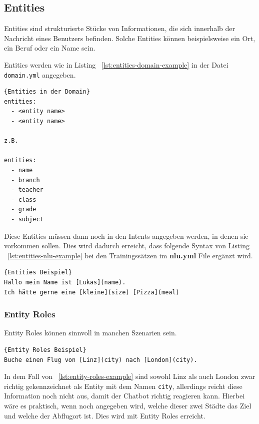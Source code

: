 \subsection{Entities}\label{subsection:entities}

Entities sind strukturierte Stücke von Informationen, die sich innerhalb der Nachricht eines Benutzers befinden.
Solche Entities können beispielsweise ein Ort, ein Beruf oder ein Name sein.\cite{entities}

Entities werden wie in Listing ~\ref{lst:entities-domain-example} in der Datei \texttt{domain.yml} angegeben.

\begin{lstlisting}[label={lst:entities-domain-example},caption={Entities in der Domain}]{Entities in der Domain}
entities:
  - <entity name>
  - <entity name>

z.B.

entities:
  - name
  - branch
  - teacher
  - class
  - grade
  - subject
\end{lstlisting}

Diese Entities müssen dann noch in den Intents angegeben werden, in denen sie vorkommen sollen.
Dies wird dadurch erreicht, dass folgende Syntax von Listing ~\ref{lst:entities-nlu-example} bei den Trainingssätzen im \textbf{nlu.yml} File ergänzt wird.

\begin{lstlisting}[label={lst:entities-nlu-example},caption={Entities Beispiel}]{Entities Beispiel}
Hallo mein Name ist [Lukas](name).
Ich hätte gerne eine [kleine](size) [Pizza](meal)
\end{lstlisting}

\subsubsection{Entity Roles}\label{subsubsec:entity-roles}

Entity Roles können sinnvoll in manchen Szenarien sein.

\begin{lstlisting}[label={lst:entity-roles-example},caption={Entity Roles Beispiel}]{Entity Roles Beispiel}
Buche einen Flug von [Linz](city) nach [London](city).
\end{lstlisting}

In dem Fall von ~\ref{lst:entity-roles-example} sind sowohl Linz als auch London zwar richtig gekennzeichnet als Entity mit dem Namen \texttt{city}, allerdings reicht diese Information noch nicht aus, damit der Chatbot richtig reagieren kann.
Hierbei wäre es praktisch, wenn noch angegeben wird, welche dieser zwei Städte das Ziel und welche der Abflugort ist.
Dies wird mit Entity Roles erreicht.\cite{entityRolesGroups}

